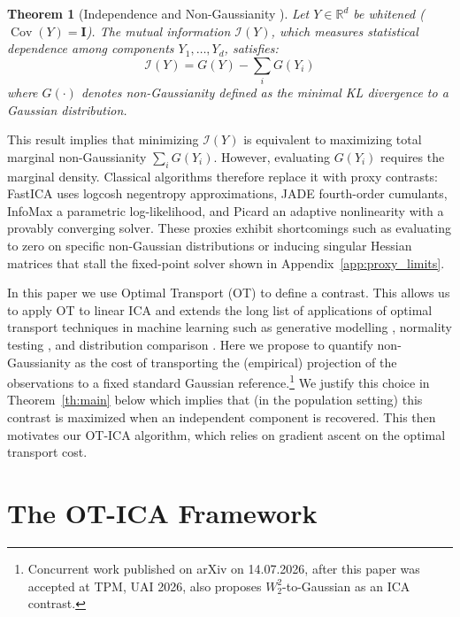 \documentclass[accepted]{tpm2026} %
\newtheorem{theorem}{Theorem}
\begin{document}
\begin{theorem}[Independence and Non-Gaussianity \citep{cardoso2022}]\label{th:pythagorean_ig_ica}
Let $Y \in \mathbb{R}^d$ be whitened ($\operatorname{Cov}(Y)=\mathbf{I}$). The mutual information $\mathscr{I}(Y)$, which measures statistical dependence among components $Y_1,\ldots,Y_d$, satisfies:
\begin{equation}
    \mathscr{I}(Y) = G(Y) - \sum_{i} G(Y_i)
\end{equation}
where $G(\cdot)$ denotes non-Gaussianity defined as the minimal KL divergence to a Gaussian distribution. 
\end{theorem}
This result implies that
minimizing $\mathscr{I}(Y)$  is equivalent to maximizing total marginal non-Gaussianity $\sum_i G(Y_i)$.
However, evaluating $G(Y_i)$ requires the marginal density. Classical algorithms therefore replace it with proxy contrasts:
FastICA \citep{hyvarinen2001, amari1996new} uses logcosh negentropy approximations, 
JADE \citep{cardoso1993blind} fourth-order cumulants, 
InfoMax \citep{bell1995information} a parametric log-likelihood, and 
Picard \citep{ablin2018faster} an adaptive nonlinearity with a provably converging solver. These proxies exhibit shortcomings such as evaluating to zero on specific non-Gaussian distributions or inducing singular Hessian matrices that stall the fixed-point solver shown in Appendix~\ref{app:proxy_limits}.

In this paper we use Optimal Transport (OT) \citep{monge1781, kantorovich1942}
to define a contrast.
This allows us to apply OT to linear ICA and extends the long list of applications of optimal transport techniques in machine learning such as generative modelling \citep{pmlr-v70-arjovsky17a}, normality testing \citep{delbarrio1999}, and
distribution comparison \citep{peyre2019computational}.
Here we propose to quantify non-Gaussianity as the cost of transporting the (empirical) projection of the observations to a fixed standard Gaussian reference.\footnote{Concurrent work \citep{laplante2026contrastfreeicacausalinference} published on arXiv on 14.07.2026, after this paper was accepted at TPM, UAI 2026, also proposes $W_2^2$-to-Gaussian as an ICA contrast.}
We justify this choice in 
Theorem~\ref{th:main} below which implies that (in the population setting) this  contrast is maximized when an independent component is recovered. This then motivates our OT-ICA algorithm, which relies on  gradient ascent on the optimal transport cost.


\section{The OT-ICA Framework}\label{sec:OT-framework}
\end{document}
